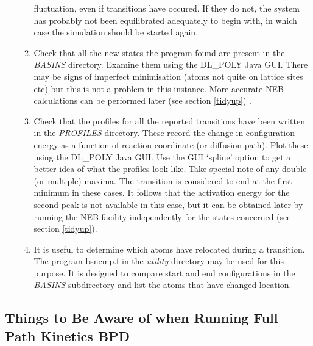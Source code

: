 \begin{enumerate}
\begin{enumerate}
  fluctuation, even if transitions have occured. If they do not, the
  system has probably not been equilibrated adequately to begin with,
  in which case the simulation should be started again.
\item Check that all the new states the program found are present in 
  the {\em BASINS} directory. Examine them using the DL\_POLY Java
  GUI. There may be signs of imperfect minimisation (atoms not quite
  on lattice sites etc) but this is not a problem in this instance.
  More accurate NEB calculations can be performed later (see section
  \ref{tidyup}) .
\item Check that the profiles for all the reported transitions have been
  written in the {\em PROFILES} directory. These record the change in
  configuration energy as a function of reaction coordinate (or
  diffusion path). 
  Plot these using the DL\_POLY Java GUI. Use the GUI `spline' option
  to get a better idea of what the profiles look like. Take special
  note of any double (or multiple) maxima. The transition is
  considered to end at the first minimum in these cases. It follows
  that the activation energy for the second peak is not available in
  this case, but it can be obtained later by running the NEB facility
  independently for the states concerned (see section \ref{tidyup}).
\item It is useful to determine which atoms have relocated during a
  transition. The program bsncmp.f in the {\em  utility} directory 
  may be used for this purpose. It is designed to compare start and 
  end configurations in the {\em BASINS} subdirectory and list the 
  atoms that have changed location.
\end{enumerate}
\end{enumerate}

\subsection{Things to Be Aware of when Running  Full Path Kinetics BPD}

